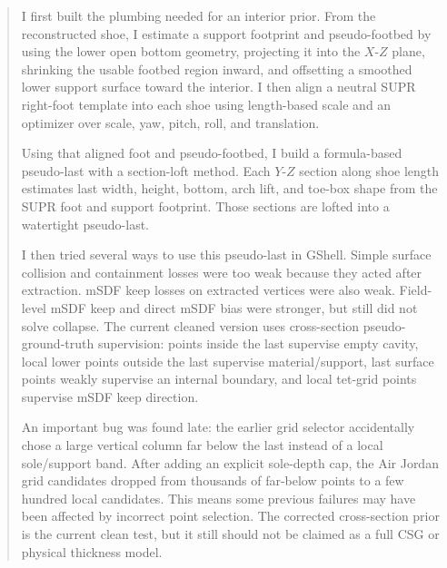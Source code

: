 \documentclass[11pt]{article}
\begin{document}
\begin{quote}
I first built the plumbing needed for an interior prior.  From the reconstructed
shoe, I estimate a support footprint and pseudo-footbed by using the lower open
bottom geometry, projecting it into the \(X\)-\(Z\) plane, shrinking the usable
footbed region inward, and offsetting a smoothed lower support surface toward
the interior.  I then align a neutral SUPR right-foot template into each shoe
using length-based scale and an optimizer over scale, yaw, pitch, roll, and
translation.

Using that aligned foot and pseudo-footbed, I build a formula-based pseudo-last
with a section-loft method.  Each \(Y\)-\(Z\) section along shoe length estimates
last width, height, bottom, arch lift, and toe-box shape from the SUPR foot and
support footprint.  Those sections are lofted into a watertight pseudo-last.

I then tried several ways to use this pseudo-last in GShell.  Simple surface
collision and containment losses were too weak because they acted after
extraction.  mSDF keep losses on extracted vertices were also weak.  Field-level
mSDF keep and direct mSDF bias were stronger, but still did not solve collapse.
The current cleaned version uses cross-section pseudo-ground-truth supervision:
points inside the last supervise empty cavity, local lower points outside the
last supervise material/support, last surface points weakly supervise an
internal boundary, and local tet-grid points supervise mSDF keep direction.

An important bug was found late: the earlier grid selector accidentally chose a
large vertical column far below the last instead of a local sole/support band.
After adding an explicit sole-depth cap, the Air Jordan grid candidates dropped
from thousands of far-below points to a few hundred local candidates.  This
means some previous failures may have been affected by incorrect point
selection.  The corrected cross-section prior is the current clean test, but it
still should not be claimed as a full CSG or physical thickness model.
\end{quote}
\end{document}
